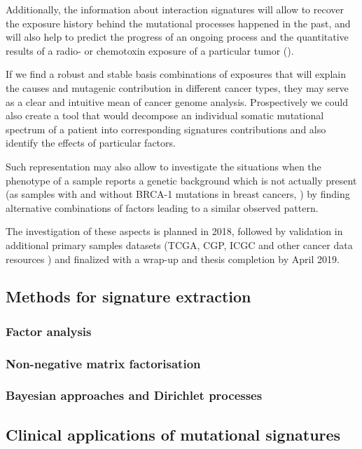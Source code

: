 Additionally, the information about interaction signatures will allow to recover the 
exposure history behind the mutational processes happened in the past, and will also 
help to predict the progress of an ongoing process and the quantitative results of a 
radio- or chemotoxin exposure of a particular tumor (\cite{Hollstein2017-ag}).

If we find a robust and stable basis combinations of exposures that will explain the 
causes and mutagenic contribution in different cancer types, they may serve as a clear 
and intuitive mean of cancer genome analysis. Prospectively we could also create a tool 
that would decompose an individual 
somatic mutational spectrum of a patient into corresponding signatures contributions and 
also identify the effects of particular factors.

Such representation may also allow to investigate the situations when the phenotype of a 
sample reports a genetic background which is not actually present (as samples with and 
without BRCA-1 mutations in breast cancers, \cite{NZ2}) by finding alternative combinations 
of factors leading to a similar observed pattern.

The investigation of these aspects is planned in 2018, followed by validation in additional 
primary samples datasets (TCGA, CGP, ICGC and other cancer data resources \cite{Tian}) and 
finalized with a wrap-up and thesis completion by April 2019.





\subsection{Methods for signature extraction}

\subsubsection*{Factor analysis}

\subsubsection*{Non-negative matrix factorisation}

\subsubsection*{Bayesian approaches and Dirichlet processes}




\subsection{Clinical applications of mutational signatures}




